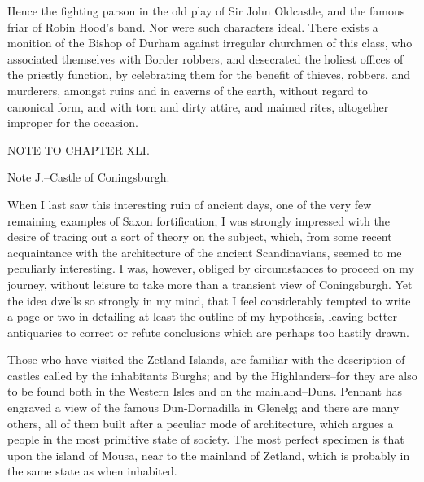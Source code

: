 Hence the fighting parson in the old play of Sir John Oldcastle, and the
famous friar of Robin Hood's band. Nor were such characters ideal. There
exists a monition of the Bishop of Durham against irregular churchmen of
this class, who associated themselves with Border robbers, and
desecrated the holiest offices of the priestly function, by celebrating
them for the benefit of thieves, robbers, and murderers, amongst ruins
and in caverns of the earth, without regard to canonical form, and with
torn and dirty attire, and maimed rites, altogether improper for the
occasion.

NOTE TO CHAPTER XLI.

Note J.--Castle of Coningsburgh.

When I last saw this interesting ruin of ancient days, one of the very
few remaining examples of Saxon fortification, I was strongly impressed
with the desire of tracing out a sort of theory on the subject, which,
from some recent acquaintance with the architecture of the ancient
Scandinavians, seemed to me peculiarly interesting. I was, however,
obliged by circumstances to proceed on my journey, without leisure to
take more than a transient view of Coningsburgh. Yet the idea dwells so
strongly in my mind, that I feel considerably tempted to write a page or
two in detailing at least the outline of my hypothesis, leaving better
antiquaries to correct or refute conclusions which are perhaps too
hastily drawn.

Those who have visited the Zetland Islands, are familiar with the
description of castles called by the inhabitants Burghs; and by the
Highlanders--for they are also to be found both in the Western Isles and
on the mainland--Duns. Pennant has engraved a view of the famous
Dun-Dornadilla in Glenelg; and there are many others, all of them built
after a peculiar mode of architecture, which argues a people in the most
primitive state of society. The most perfect specimen is that upon the
island of Mousa, near to the mainland of Zetland, which is probably in
the same state as when inhabited.

